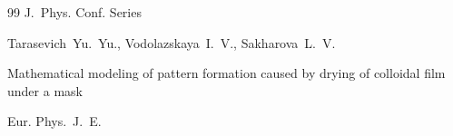 \begin{thebibliography}{99}
\jour J.~Phys. Conf. Series









\by Tarasevich~Yu.~Yu., Vodolazskaya~I.~V., Sakharova~L.~V.

\paper Mathematical modeling of pattern formation caused by drying of colloidal film under a mask

\jour Eur. Phys.~J.~E.








\end{thebibliography}





%


